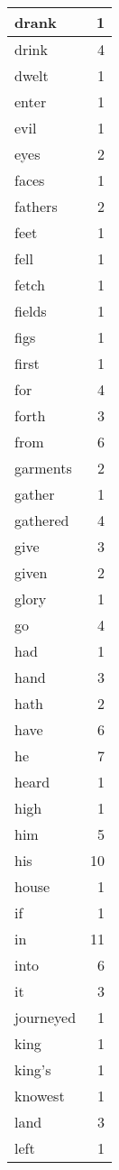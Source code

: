 \begin{center}
\begin{longtable}{l|r}
drank & 1 \\ \hline
drink & 4 \\ \hline
dwelt & 1 \\ \hline
enter & 1 \\ \hline
evil & 1 \\ \hline
eyes & 2 \\ \hline
faces & 1 \\ \hline
fathers & 2 \\ \hline
feet & 1 \\ \hline
fell & 1 \\ \hline
fetch & 1 \\ \hline
fields & 1 \\ \hline
figs & 1 \\ \hline
first & 1 \\ \hline
for & 4 \\ \hline
forth & 3 \\ \hline
from & 6 \\ \hline
garments & 2 \\ \hline
gather & 1 \\ \hline
gathered & 4 \\ \hline
give & 3 \\ \hline
given & 2 \\ \hline
glory & 1 \\ \hline
go & 4 \\ \hline
had & 1 \\ \hline
hand & 3 \\ \hline
hath & 2 \\ \hline
have & 6 \\ \hline
he & 7 \\ \hline
heard & 1 \\ \hline
high & 1 \\ \hline
him & 5 \\ \hline
his & 10 \\ \hline
house & 1 \\ \hline
if & 1 \\ \hline
in & 11 \\ \hline
into & 6 \\ \hline
it & 3 \\ \hline
journeyed & 1 \\ \hline
king & 1 \\ \hline
king's & 1 \\ \hline
knowest & 1 \\ \hline
land & 3 \\ \hline
left & 1 \\ \hline

\end{longtable}
\end{center}
